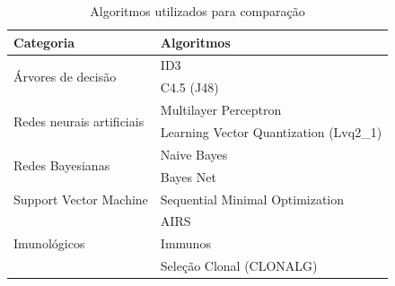 \vspace{0.5cm}
\begin{table}[h]
    \centering
    \caption{Algoritmos utilizados para comparação}
    \label{tbl:dev_algs}
    \vspace{0.5cm}
    \begin{tabular}{|l|l|}
        \hline
        \textbf{Categoria}                         & \textbf{Algoritmos}                    \\
        \hline
        \multirow{2}{*}{Árvores de decisão}        & ID3                                    \\ \cline{2-2}
                                                   & C4.5 (J48)                             \\
        \hline
        \multirow{2}{*}{Redes neurais artificiais} & Multilayer Perceptron                  \\ \cline{2-2}
                                                   & Learning Vector Quantization (Lvq2\_1) \\
        \hline
        \multirow{2}{*}{Redes Bayesianas}          & Naive Bayes                            \\ \cline{2-2}
                                                   & Bayes Net                              \\
        \hline
        Support Vector Machine                     & Sequential Minimal Optimization        \\
        \hline
        \multirow{3}{*}{Imunológicos}              & AIRS                                   \\ \cline{2-2}
                                                   & Immunos                                \\ \cline{2-2}
                                                   & Seleção Clonal (CLONALG)               \\
        \hline
    \end{tabular}
\end{table}
\vspace{0.5cm}

